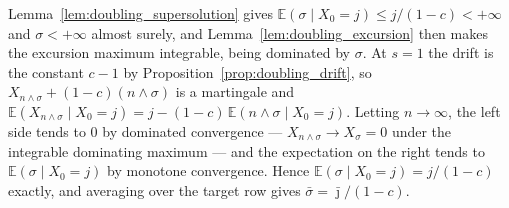 Lemma~\ref{lem:doubling_supersolution} gives $\mathbb E(\sigma\mid X_0=j)\leq j/(1-c)<+\infty$
and $\sigma<+\infty$ almost surely, and Lemma~\ref{lem:doubling_excursion} then makes the
excursion maximum integrable, being dominated by $\sigma$. At $s=1$ the drift is the constant
$c-1$ by Proposition~\ref{prop:doubling_drift}, so $X_{n\wedge\sigma}+(1-c)(n\wedge\sigma)$ is
a martingale and
$\mathbb E(X_{n\wedge\sigma}\mid X_0=j)=j-(1-c)\,\mathbb E(n\wedge\sigma\mid X_0=j)$. Letting
$n\rightarrow\infty$, the left side tends to $0$ by dominated convergence --- $X_{n\wedge\sigma}
\rightarrow X_\sigma=0$ under the integrable dominating maximum --- and the expectation on the
right tends to $\mathbb E(\sigma\mid X_0=j)$ by monotone convergence. Hence
$\mathbb E(\sigma\mid X_0=j)=j/(1-c)$ exactly, and averaging over the target row gives
$\bar\sigma=\bar\jmath/(1-c)$.
